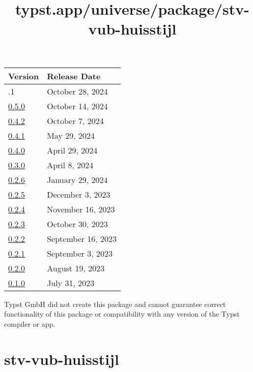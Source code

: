 \begin{longtable}[]{@{}ll@{}}
\toprule\noalign{}
Version & Release Date \\
\midrule\noalign{}
\endhead
\bottomrule\noalign{}
\endlastfoot
0.5.1 & October 28, 2024 \\
\href{https://typst.app/universe/package/glossarium/0.5.0/}{0.5.0} &
October 14, 2024 \\
\href{https://typst.app/universe/package/glossarium/0.4.2/}{0.4.2} &
October 7, 2024 \\
\href{https://typst.app/universe/package/glossarium/0.4.1/}{0.4.1} & May
29, 2024 \\
\href{https://typst.app/universe/package/glossarium/0.4.0/}{0.4.0} &
April 29, 2024 \\
\href{https://typst.app/universe/package/glossarium/0.3.0/}{0.3.0} &
April 8, 2024 \\
\href{https://typst.app/universe/package/glossarium/0.2.6/}{0.2.6} &
January 29, 2024 \\
\href{https://typst.app/universe/package/glossarium/0.2.5/}{0.2.5} &
December 3, 2023 \\
\href{https://typst.app/universe/package/glossarium/0.2.4/}{0.2.4} &
November 16, 2023 \\
\href{https://typst.app/universe/package/glossarium/0.2.3/}{0.2.3} &
October 30, 2023 \\
\href{https://typst.app/universe/package/glossarium/0.2.2/}{0.2.2} &
September 16, 2023 \\
\href{https://typst.app/universe/package/glossarium/0.2.1/}{0.2.1} &
September 3, 2023 \\
\href{https://typst.app/universe/package/glossarium/0.2.0/}{0.2.0} &
August 19, 2023 \\
\href{https://typst.app/universe/package/glossarium/0.1.0/}{0.1.0} &
July 31, 2023 \\
\end{longtable}

Typst GmbH did not create this package and cannot guarantee correct
functionality of this package or compatibility with any version of the
Typst compiler or app.


\title{typst.app/universe/package/stv-vub-huisstijl}

\label{banner}
\label{template-thumbnail}

\section{stv-vub-huisstijl}\label{stv-vub-huisstijl}

